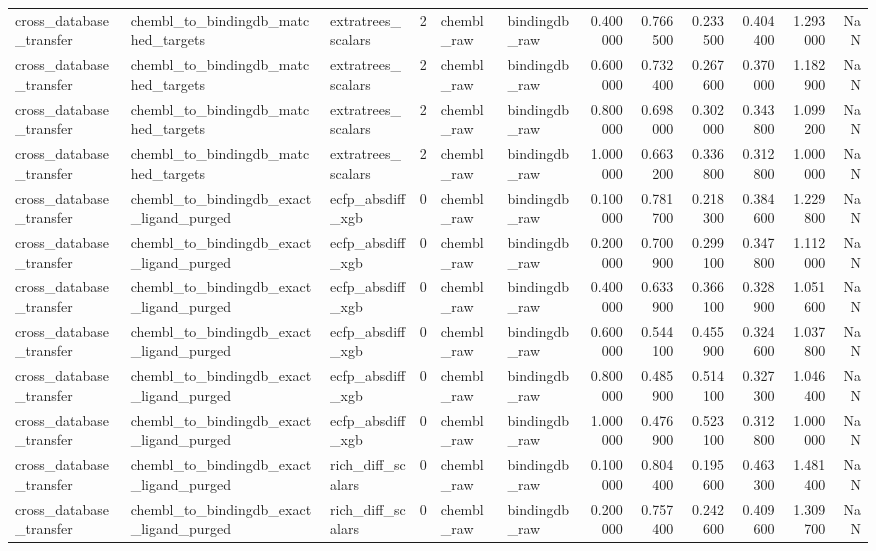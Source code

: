 \begin{longtable}{lllrllrrrrrr}
cross\_database\_transfer & chembl\_to\_bindingdb\_matched\_targets & extratrees\_scalars & 2 & chembl\_raw & bindingdb\_raw & 0.400000 & 0.766500 & 0.233500 & 0.404400 & 1.293000 & NaN \\
cross\_database\_transfer & chembl\_to\_bindingdb\_matched\_targets & extratrees\_scalars & 2 & chembl\_raw & bindingdb\_raw & 0.600000 & 0.732400 & 0.267600 & 0.370000 & 1.182900 & NaN \\
cross\_database\_transfer & chembl\_to\_bindingdb\_matched\_targets & extratrees\_scalars & 2 & chembl\_raw & bindingdb\_raw & 0.800000 & 0.698000 & 0.302000 & 0.343800 & 1.099200 & NaN \\
cross\_database\_transfer & chembl\_to\_bindingdb\_matched\_targets & extratrees\_scalars & 2 & chembl\_raw & bindingdb\_raw & 1.000000 & 0.663200 & 0.336800 & 0.312800 & 1.000000 & NaN \\
cross\_database\_transfer & chembl\_to\_bindingdb\_exact\_ligand\_purged & ecfp\_absdiff\_xgb & 0 & chembl\_raw & bindingdb\_raw & 0.100000 & 0.781700 & 0.218300 & 0.384600 & 1.229800 & NaN \\
cross\_database\_transfer & chembl\_to\_bindingdb\_exact\_ligand\_purged & ecfp\_absdiff\_xgb & 0 & chembl\_raw & bindingdb\_raw & 0.200000 & 0.700900 & 0.299100 & 0.347800 & 1.112000 & NaN \\
cross\_database\_transfer & chembl\_to\_bindingdb\_exact\_ligand\_purged & ecfp\_absdiff\_xgb & 0 & chembl\_raw & bindingdb\_raw & 0.400000 & 0.633900 & 0.366100 & 0.328900 & 1.051600 & NaN \\
cross\_database\_transfer & chembl\_to\_bindingdb\_exact\_ligand\_purged & ecfp\_absdiff\_xgb & 0 & chembl\_raw & bindingdb\_raw & 0.600000 & 0.544100 & 0.455900 & 0.324600 & 1.037800 & NaN \\
cross\_database\_transfer & chembl\_to\_bindingdb\_exact\_ligand\_purged & ecfp\_absdiff\_xgb & 0 & chembl\_raw & bindingdb\_raw & 0.800000 & 0.485900 & 0.514100 & 0.327300 & 1.046400 & NaN \\
cross\_database\_transfer & chembl\_to\_bindingdb\_exact\_ligand\_purged & ecfp\_absdiff\_xgb & 0 & chembl\_raw & bindingdb\_raw & 1.000000 & 0.476900 & 0.523100 & 0.312800 & 1.000000 & NaN \\
cross\_database\_transfer & chembl\_to\_bindingdb\_exact\_ligand\_purged & rich\_diff\_scalars & 0 & chembl\_raw & bindingdb\_raw & 0.100000 & 0.804400 & 0.195600 & 0.463300 & 1.481400 & NaN \\
cross\_database\_transfer & chembl\_to\_bindingdb\_exact\_ligand\_purged & rich\_diff\_scalars & 0 & chembl\_raw & bindingdb\_raw & 0.200000 & 0.757400 & 0.242600 & 0.409600 & 1.309700 & NaN \\

\end{longtable}
